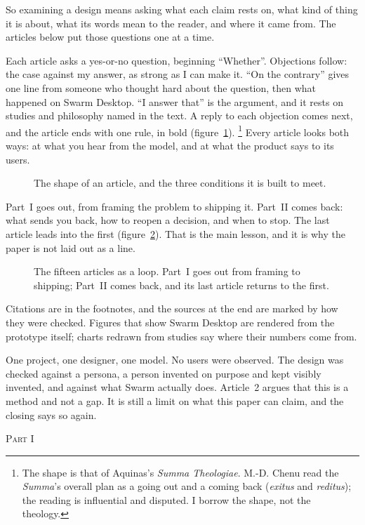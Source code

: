 \documentclass[11pt,a4paper]{article}
\newcommand{\KeepLines}[1]{\par\vskip 0pt plus #1\baselineskip\penalty-200\vskip 0pt plus -#1\baselineskip}
\newcommand{\PartHead}[2]{%
  \clearpage
  \vspace*{8mm}
  {\centering\textsc{Part #1}\par\vspace{2mm}{\Large\itshape #2}\par}
  \vspace{8mm}\suppressfloats[t]}
\newcommand{\Head}[1]{%
  \KeepLines{6}\vspace{6mm}{\large\itshape #1}\par\vspace{2mm}\noindent\ignorespaces}
\newcounter{art}
\newcommand{\Fig}[3]{%
  \begin{figure}[tbp]\centering #1 \caption{#2}\label{#3}\end{figure}}
\begin{document}
So examining a design means asking what each claim rests on, what kind of thing it is about, what its words mean to the reader, and where it came from. The articles below put those questions one at a time.

\Head{How to read an article}
Each article asks a yes-or-no question, beginning ``Whether''. Objections follow: the case against my answer, as strong as I can make it. ``On the contrary'' gives one line from someone who thought hard about the question, then what happened on Swarm Desktop. ``I answer that'' is the argument, and it rests on studies and philosophy named in the text. A reply to each objection comes next, and the article ends with one rule, in bold (figure~\ref{fig:shape}).%
\footnote{The shape is that of Aquinas's \textit{Summa Theologiae}. M.-D. Chenu read the \textit{Summa}'s overall plan as a going out and a coming back (\textit{exitus} and \textit{reditus}); the reading is influential and disputed. I borrow the shape, not the theology.}
Every article looks both ways: at what you hear from the model, and at what the product says to its users.

\Fig{\FigArticleShape}{The shape of an article, and the three conditions it is built to meet.}{fig:shape}

Part~I goes out, from framing the problem to shipping it. Part~II comes back: what sends you back, how to reopen a decision, and when to stop. The last article leads into the first (figure~\ref{fig:loop}). That is the main lesson, and it is why the paper is not laid out as a line.

\Fig{\FigLoop}{The fifteen articles as a loop. Part~I goes out from framing to shipping; Part~II comes back, and its last article returns to the first.}{fig:loop}

Citations are in the footnotes, and the sources at the end are marked by how they were checked. Figures that show Swarm Desktop are rendered from the prototype itself; charts redrawn from studies say where their numbers come from.

\Head{What this rests on}
One project, one designer, one model. No users were observed. The design was checked against a persona, a person invented on purpose and kept visibly invented, and against what Swarm actually does. Article~2 argues that this is a method and not a gap. It is still a limit on what this paper can claim, and the closing says so again.

\PartHead{I}{Going out}
\end{document}
